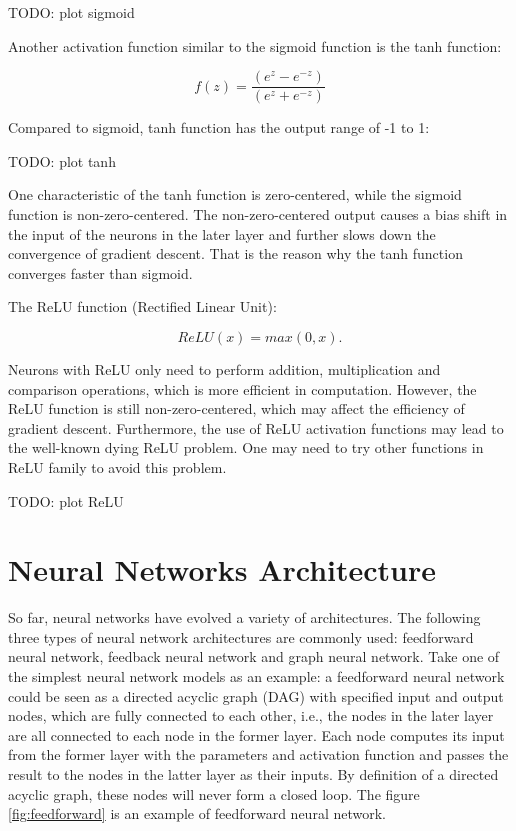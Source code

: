 \documentclass[
	parskip, 			   %
	twoside, 			   %
	DIV=14, 			   %
	BCOR=15.0mm, 		   %
	headsepline, 		   %
	open=right, 		   %
	captions=tableheading, %
	bibliography=totoc,    %
	numbers=noenddot       %
]{scrreprt}
\begin{document}
TODO: plot sigmoid

Another activation function similar to the sigmoid function is the tanh function:

\begin{equation}
    \label{eq:tanh}
    f(z)=\frac{\left(e^{z}-e^{-z}\right)}{\left(e^{z}+e^{-z}\right)}
\end{equation}

Compared to sigmoid, tanh function has the output range of -1 to 1:

TODO: plot tanh

One characteristic of the tanh function is zero-centered, while the sigmoid function is non-zero-centered. The non-zero-centered output causes a bias shift in the input of the neurons in the later layer and further slows down the convergence of gradient descent. That is the reason why the tanh function converges faster than sigmoid.


The ReLU function (Rectified Linear Unit):

\begin{equation}
    \label{eq:ReLU}
    ReLU(x) = max(0,x).
\end{equation}

Neurons with ReLU only need to perform addition, multiplication and comparison operations, which is more efficient in computation. However, the ReLU function is still non-zero-centered, which may affect the efficiency of gradient descent. Furthermore, the use of ReLU activation functions may lead to the well-known dying ReLU problem. One may need to try other functions in ReLU family to avoid this problem.

TODO: plot ReLU


\section{Neural Networks Architecture}
So far, neural networks have evolved a variety of architectures. The following three types of neural network architectures are commonly used: feedforward neural network, feedback neural network and graph neural network.
Take one of the simplest neural network models as an example: a feedforward neural network could be seen as a directed acyclic graph (DAG) with specified input and output nodes, which are fully connected to each other, i.e., the nodes in the later layer are all connected to each node in the former layer. Each node computes its input from the former layer with the parameters and activation function and passes the result to the nodes in the latter layer as their inputs. By definition of a directed acyclic graph, these nodes will never form a closed loop. The figure \ref{fig:feedforward} is an example of feedforward neural network.
\end{document}
